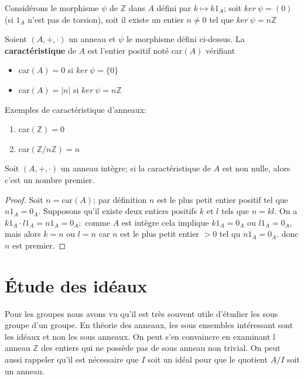 Considérons le morphisme $\psi$ de $\mathbb{Z}$ dans $A$ défini par $k\mapsto k1_A$; soit $ker \: \psi=(0)$ (si $1_A$ n'est pas de torsion), soit il existe un entier $n\neq0$ tel que $ker \: \psi=n\mathbb{Z}$


    \begin{definition}
        Soient $(A,+,\cdot)$ un anneau et $\psi$ le morphisme défini ci-dessus.
        La \textbf{caractéristique} de $A$ est l'entier positif noté car$(A)$ vérifiant
        \begin{itemize}
            \item car$(A)=0$ si $ker\: \psi=\{0\}$
            \item  car$(A)= |n|$ si $ker \: \psi=n\mathbb{Z}$ 
        \end{itemize}
    \end{definition}

    \begin{exemple}
    Exemples de caractéristique d'anneaux:
        \begin{enumerate}
            \item car$(\mathbb{Z})=0$
            \item car$(\mathbb{Z}/n\mathbb{Z})=n$
        \end{enumerate}
    \end{exemple}


\begin{proposition}
    Soit $(A,+,\cdot)$ un anneau intègre; si la caractéristique de $A$ est non nulle, alors c'est un nombre premier.
\end{proposition}
\begin{proof}
    Soit $n=\text{car}(A)$; par définition $n$ est le plus petit entier positif tel que $n1_A=0_A$. Supposons qu'il existe deux entiers positifs $k$ et $l$ tels que $n=kl$. On a $k1_A\cdot l1_A=n1_A=0_A;$ comme $A$ est intègre cela implique $k1_A=0_A$ ou $l1_A=0_A$, mais alors $k=n$ ou $l=n$ car $n$ est le plus petit entier $>0$ tel qu $n1_A=0_A$. donc $n$ est premier.
\end{proof}
\section{Étude des idéaux}
Pour les groupes nous avons vu qu'il est très souvent utile d'étudier les sous groupe d'un groupe. En théorie des anneaux, les sous ensembles intéressant sont les idéaux et non les sous anneaux. On  peut s'en convaincre en examinant l anneau $\mathbb{Z}$ des entiers qui ne possède pas de sous anneau non trivial. On peut aussi rappeler qu'il est nécessaire que $I$ soit un idéal pour que le quotient $A/I$ soit un anneau.\\

